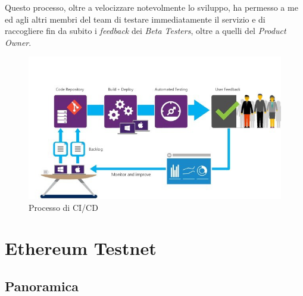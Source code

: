 \documentclass[11pt]{thesistemp}
\begin{document}
Questo processo, oltre a velocizzare notevolmente lo sviluppo, ha permesso a me ed agli altri membri del team di testare immediatamente il servizio e di raccogliere fin da subito i \textit{feedback} dei \textit{Beta Testers}, oltre a quelli del \textit{Product Owner}.
\begin{figure}[h]
    \centering
    \includegraphics[scale=0.59]{ci-cd.png}
        \caption{Processo di CI/CD}
    \label{fig:ci-cd}
\end{figure}

\section{Ethereum Testnet}

\subsection{Panoramica}
\end{document}

